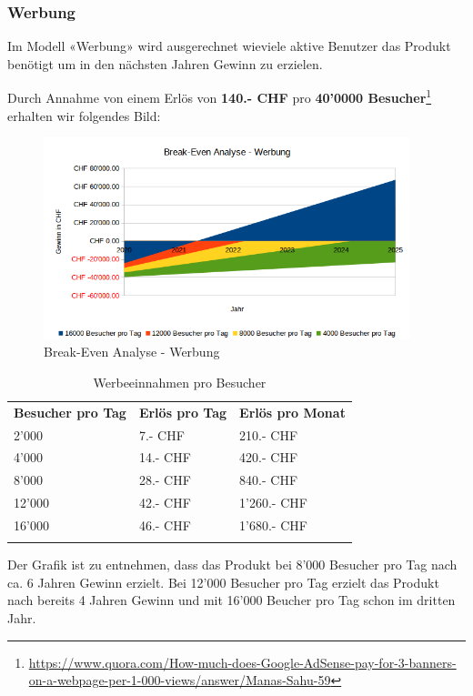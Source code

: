 \subsubsection{Werbung}

Im Modell «Werbung» wird ausgerechnet wieviele aktive Benutzer das Produkt benötigt
um in den nächsten Jahren Gewinn zu erzielen.

Durch Annahme von einem Erlös von \textbf{140.- CHF} pro \textbf{40'0000 Besucher}\footnote{\url{https://www.quora.com/How-much-does-Google-AdSense-pay-for-3-banners-on-a-webpage-per-1-000-views/answer/Manas-Sahu-59}} erhalten wir folgendes Bild:

\begin{figure}[!htb]
  \centering
  \includegraphics[width=0.95\textwidth]{initialisierung/wirtschaftlichkeit-werbung.png}
  \caption{Break-Even Analyse - Werbung}
\end{figure}

\begin{longtable}[]{@{}lll@{}}
  \toprule
  \textbf{Besucher pro Tag} & \textbf{Erlös pro Tag} & \textbf{Erlös pro Monat}\tabularnewline
   2'000                    & 7.- CHF                & 210.- CHF\tabularnewline
   4'000                    & 14.- CHF               & 420.- CHF\tabularnewline
   8'000                    & 28.- CHF               & 840.- CHF\tabularnewline
  12'000                    & 42.- CHF               & 1'260.- CHF\tabularnewline
  16'000                    & 46.- CHF               & 1'680.- CHF\tabularnewline
  \bottomrule
  \caption{Werbeeinnahmen pro Besucher}
\end{longtable}

Der Grafik ist zu entnehmen, dass das Produkt bei 8'000 Besucher pro Tag nach ca. 6 Jahren Gewinn erzielt. Bei 12'000 Besucher pro Tag erzielt das Produkt nach bereits 4 Jahren Gewinn und mit 16'000 Beucher pro Tag schon im dritten Jahr.
